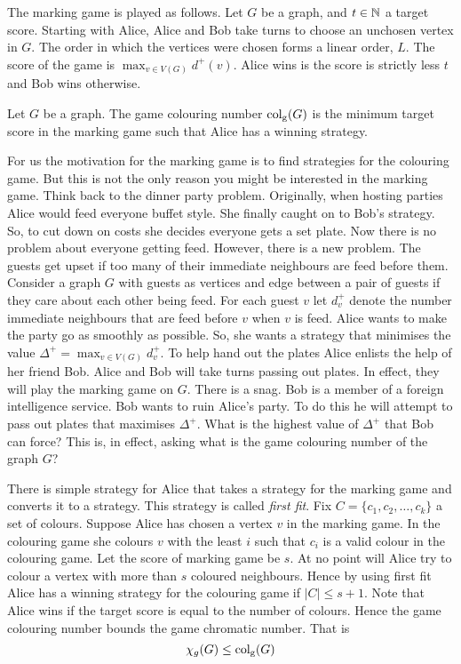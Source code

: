 The marking game is played as follows. Let $G$ be a graph, and $t\in\mathbb{N}$ a target score. Starting with Alice, Alice and Bob take turns to choose an unchosen vertex in $G$. The order in which the vertices were chosen forms a linear order, $L$. The score of the game is $\max_{v\in V(G)}d^+(v)$. Alice wins is the score is strictly less $t$ and Bob wins otherwise. 
%
\begin{definition}
    Let $G$ be a graph. The game colouring number $\operatorname{col_g}(G)$ is the minimum target score in the marking game such that Alice has a winning strategy. 
\end{definition}
%

For us the motivation for the marking game is to find strategies for the colouring game. But this is not the only reason you might be interested in the marking game. Think back to the dinner party problem. Originally, when hosting parties Alice would feed everyone buffet style. She finally caught on to Bob's strategy. So, to cut down on costs she decides everyone gets a set plate. Now there is no problem about everyone getting feed. However, there is a new problem. The guests get upset if too many of their immediate neighbours are feed before them. Consider a graph $G$ with guests as vertices and edge between a pair of guests if they care about each other being feed. For each guest $v$ let $d^+_v$ denote the number immediate neighbours that are feed before $v$ when $v$ is feed. Alice wants to make the party go as smoothly as possible. So, she wants a strategy that minimises the value $\Delta^+=\max_{v\in V(G)} d^+_v$.
To help hand out the plates Alice enlists the help of her friend Bob. Alice and Bob will take turns passing out plates. In effect, they will play the marking game on $G$. There is a snag. Bob is a member of a foreign intelligence service. Bob wants to ruin Alice's party. To do this he will attempt to pass out plates that maximises $\Delta^+$. What is the highest value of $\Delta^+$ that Bob can force? This is, in effect, asking what is the game colouring number of the graph $G$?

There is simple strategy for Alice that takes a strategy for the marking game and converts it to a strategy. This strategy is called \textit{first fit}. Fix $C=\{c_1,c_2,\dots,c_k\}$ a set of colours. Suppose Alice has chosen a vertex $v$ in the marking game. In the colouring game she colours $v$ with the least $i$ such that $c_i$ is a valid colour in the colouring game. Let the score of marking game be $s$. At no point will Alice try to colour a vertex with more than $s$ coloured neighbours. Hence by using first fit Alice has a winning strategy for the colouring game if $|C|\leq s+1$. Note that Alice wins if the target score is equal to the number of colours. Hence the game colouring number bounds the game chromatic number. That is \[\chi_g(G)\leq\operatorname{col_g}(G)\]


